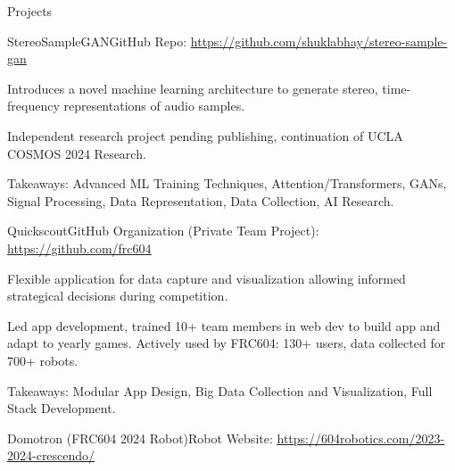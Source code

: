 \documentclass[
  11pt, %
]{public/resume/resume} %
\begin{document}

\begin{rSection}{Projects}

  
  \begin{rSubsection}{StereoSampleGAN}{}{GitHub Repo: \underline{\href{https://github.com/shuklabhay/stereo-sample-gan}{https://github.com/shuklabhay/stereo-sample-gan}}}{}
       
    \item Introduces a novel machine learning architecture to generate stereo, time-frequency representations of audio samples.
        
    \item Independent research project pending publishing, continuation of UCLA COSMOS 2024 Research.
        
    \item Takeaways: Advanced ML Training Techniques, Attention/Transformers, GANs, Signal Processing, Data Representation, Data Collection, AI Research.
        
  \end{rSubsection}
      
  \begin{rSubsection}{Quickscout}{}{GitHub Organization (Private Team Project): \underline{\href{https://github.com/frc604}{https://github.com/frc604}}}{}
       
    \item Flexible application for data capture and visualization allowing informed strategical decisions during competition.
        
    \item Led app development, trained 10+ team members in web dev to build app and adapt to yearly games. Actively used by FRC604: 130+ users, data collected for 700+ robots.
        
    \item Takeaways: Modular App Design, Big Data Collection and Visualization, Full Stack Development.
        
  \end{rSubsection}
      
  \begin{rSubsection}{Domotron (FRC604 2024 Robot)}{}{Robot Website: \underline{\href{https://604robotics.com/2023-2024-crescendo/}{https://604robotics.com/2023-2024-crescendo/}}}{}
       

\end{rSubsection}
\end{rSection}
\end{document}
